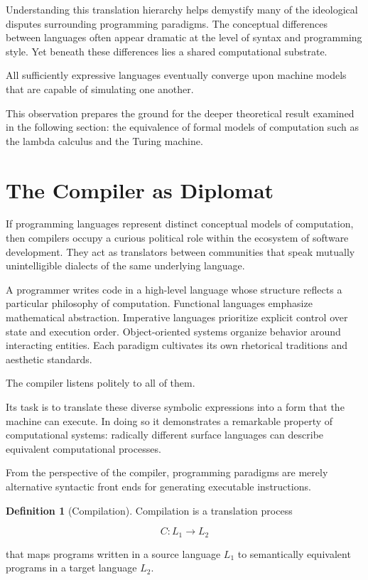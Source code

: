 \documentclass[11pt]{article}
\theoremstyle{definition}
\newtheorem{definition}{Definition}[section]
\begin{document}
Understanding this translation hierarchy helps demystify many of the
ideological disputes surrounding programming paradigms. The conceptual
differences between languages often appear dramatic at the level of
syntax and programming style. Yet beneath these differences lies a
shared computational substrate.

All sufficiently expressive languages eventually converge upon machine
models that are capable of simulating one another.

This observation prepares the ground for the deeper theoretical result
examined in the following section: the equivalence of formal models of
computation such as the lambda calculus and the Turing machine.

\section{The Compiler as Diplomat}

If programming languages represent distinct conceptual models of
computation, then compilers occupy a curious political role within the
ecosystem of software development. They act as translators between
communities that speak mutually unintelligible dialects of the same
underlying language.

A programmer writes code in a high-level language whose structure
reflects a particular philosophy of computation. Functional languages
emphasize mathematical abstraction. Imperative languages prioritize
explicit control over state and execution order. Object-oriented
systems organize behavior around interacting entities. Each paradigm
cultivates its own rhetorical traditions and aesthetic standards.

The compiler listens politely to all of them.

Its task is to translate these diverse symbolic expressions into a form
that the machine can execute. In doing so it demonstrates a remarkable
property of computational systems: radically different surface
languages can describe equivalent computational processes.

From the perspective of the compiler, programming paradigms are merely
alternative syntactic front ends for generating executable
instructions.

\begin{definition}[Compilation]
Compilation is a translation process

\[
C : L_1 \rightarrow L_2
\]

that maps programs written in a source language $L_1$ to semantically
equivalent programs in a target language $L_2$.
\end{definition}
\end{document}
